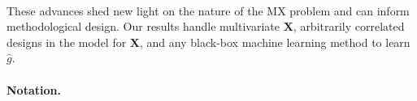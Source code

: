 \documentclass[12pt]{article}
\theoremstyle{definition}
\theoremstyle{remark}
\newcommand{\prx}{\bm X}
\newcommand{\prz}{\bm Z}
\newcommand{\srz}{Z}
\newcommand{\pry}{{\bm Y}}
\newcommand{\sry}{Y}
\begin{document}
%




\paragraph*{}

These advances shed new light on the nature of the MX problem and can inform methodological design. Our results handle multivariate $\prx$, arbitrarily correlated designs in the model for $\prx$, and any black-box machine learning method to learn $\widehat g$. 
\paragraph{Notation.}
\end{document}
